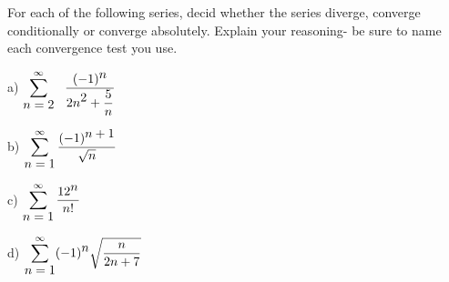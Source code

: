 \vspace{3.5in}








\vspace{3.5in}


\newpage

\quest For each of the following series, decid whether the series diverge,
converge conditionally or converge absolutely.  Explain your reasoning-
be sure to name  each convergence test you use.
\quend

\noindent a) 
$\displaystyle \sum_{\ds n=2}^{\infty}\ \  \frac{(-1)^{\ds n}}{\ds 2n^{\ds 2}+\frac{\ds 5}{\ds n}} $ 

\vspace{1.3in}

\noindent b) $\displaystyle \sum_{\displaystyle n=1}^{\infty} \frac{(-1)^{\displaystyle n+1}}{\sqrt{n}} $ 

\vspace{1.3in}

\noindent c) $\displaystyle \sum_{\displaystyle n=1}^{\infty} \frac{12^{\displaystyle n}}{n!} $ 

\vspace{1.3in}

\noindent d) $\displaystyle \sum_{\displaystyle n=1}^{\infty} (-1)^{\displaystyle n} \sqrt{ \frac{\displaystyle n}{\displaystyle 2n+7}} $ 
\vspace{1.3in}



